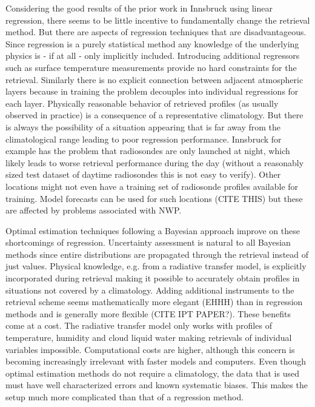     Considering the good results of the prior work in Innsbruck using linear
    regression, there seems to be little incentive to fundamentally change the
    retrieval method. But there are aspects of regression techniques that are
    disadvantageous. Since regression is a purely statistical method any
    knowledge of the underlying physics is - if at all - only implicitly
    included. Introducing additional regressors such as surface temperature
    measurements provide no hard constraints for the retrieval. Similarly
    there is no explicit connection between adjacent atmospheric layers because
    in training the problem decouples into individual regressions for each
    layer. Physically reasonable behavior of retrieved profiles (as usually
    observed in practice) is a consequence of a representative climatology.
    But there is always the possibility of a situation appearing that is far
    away from the climatological range leading to poor regression performance.
    Innsbruck for example has the problem that radiosondes are only launched at
    night, which likely leads to worse retrieval performance during the day
    (without a reasonably sized test dataset of daytime radiosondes this is not
    easy to verify).  Other locations might not even have a training set of
    radiosonde profiles available for training. Model forecasts can be used for
    such locations (CITE THIS) but these are affected by problems associated
    with NWP.

    Optimal estimation techniques following a Bayesian approach improve on
    these shortcomings of regression. Uncertainty assessment is natural to all
    Bayesian methods since entire distributions are propagated through the
    retrieval instead of just values. Physical knowledge, e.g. from a radiative
    transfer model, is explicitly incorporated during retrieval making it
    possible to accurately obtain profiles in situations not covered by
    a climatology. Adding additional instruments to the retrieval scheme seems
    mathematically more elegant (EHHH) than in regression methods and is
    generally more flexible (CITE IPT PAPER?). These benefits come at a cost.
    The radiative transfer model only works with profiles of temperature,
    humidity and cloud liquid water making retrievals of individual variables
    impossible. Computational costs are higher, although this concern is
    becoming increasingly irrelevant with faster models and computers. Even
    though optimal estimation methods do not require a climatology, the data
    that is used must have well characterized errors and known systematic
    biases. This makes the setup much more complicated than that of
    a regression method.

